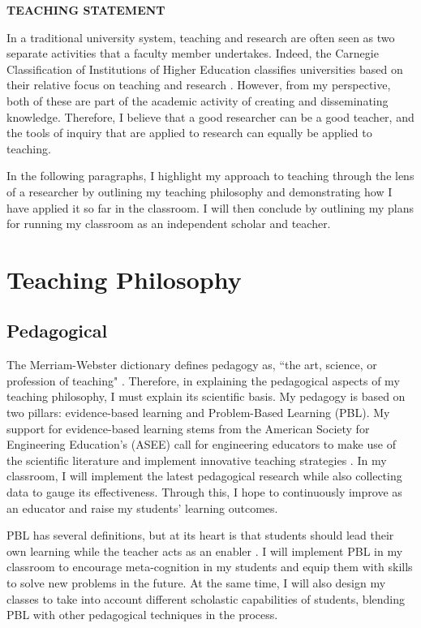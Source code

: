\documentclass[12pt]{article}
\begin{document}
 \sloppy %
\begin{center}
{\large \uppercase{\textbf{Teaching Statement}}}
\end{center}

In a traditional university system, teaching and research are often seen as two separate activities that a faculty member undertakes. Indeed, the Carnegie Classification of Institutions of Higher Education classifies universities based on their relative focus on teaching and research \cite{carnegie1994classification}. However, from my perspective, both of these are part of the academic activity of creating and disseminating knowledge. Therefore, I believe that a good researcher can be a good teacher, and the tools of inquiry that are applied to research can equally be applied to teaching. 

In the following paragraphs, I highlight my approach to teaching through the lens of a researcher by outlining my teaching philosophy and demonstrating how I have applied it so far in the classroom. I will then conclude by outlining my plans for running my classroom as an independent scholar and teacher. 

\section*{Teaching Philosophy}
\subsection*{Pedagogical}
The Merriam-Webster dictionary defines pedagogy as, ``the art, science, or profession of teaching" \cite{merriam-webster-pedagogy}. Therefore, in explaining the pedagogical aspects of my teaching philosophy, I must explain its scientific basis. My pedagogy is based on two pillars: evidence-based learning and Problem-Based Learning (PBL). My support for evidence-based learning stems from the American Society for Engineering Education's (ASEE) call for engineering educators to make use of the scientific literature and implement innovative teaching strategies \cite{jamieson2009creating}. In my classroom, I will implement the latest pedagogical research while also collecting data to gauge its effectiveness. Through this, I hope to continuously improve as an educator and raise my students' learning outcomes.

PBL has several definitions, but at its heart is that students should lead their own learning while the teacher acts as an enabler \cite{albanese1993problem}. I will implement PBL in my classroom to encourage meta-cognition in my students and equip them with skills to solve new problems in the future. At the same time, I will also design my classes to take into account different scholastic capabilities of students, blending PBL with other pedagogical techniques in the process.    
\end{document}
